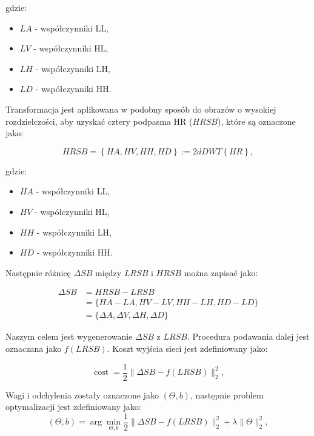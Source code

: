 gdzie:
\begin{itemize}
    \item $LA$ - współczynniki LL,
    \item $LV$ - współczynniki HL,
    \item $LH$ - współczynniki LH,
    \item $LD$ - współczynniki HH.
\end{itemize}


\newpage
Transformacja jest aplikowana w podobny sposób do obrazów o wysokiej rozdzielczości, aby uzyskać cztery podpasma HR ($HRSB$), które są oznaczone jako:

\begin{equation}
    H R S B = \left\{ HA, HV, HH, HD \right\} := 2dDWT\left\{HR\right\}, \label{eq:3.3}
\end{equation}

gdzie:
\begin{itemize}
    \item $HA$ - współczynniki LL,
    \item $HV$ - współczynniki HL,
    \item $HH$ - współczynniki LH,
    \item $HD$ - współczynniki HH.
\end{itemize}

Następnie różnicę $\Delta SB$ między $LRSB$ i $HRSB$ można zapisać jako:

\begin{equation}
    \begin{aligned}
    \Delta SB   & ={H R S B} - {L R S B} \\
                & =\{{HA}-{LA}, {HV}-{LV}, {HH}-{LH}, {HD}-{LD}\} \\
                & =\{\Delta {A}, \Delta {V}, \Delta {H}, \Delta {D}\}
    \end{aligned}
    \label{eq:3.4}
\end{equation}

Naszym celem jest wygenerowanie $\Delta SB$ z $LRSB$. Procedura podawania dalej jest oznaczana jako $f(LRSB)$. Koszt wyjścia sieci jest zdefiniowany jako:

\begin{equation}
    \operatorname{cost}=\frac{1}{2}\|\Delta SB-f(LRSB)\|_2^2,
\end{equation}


Wagi i odchylenia zostały oznaczone jako $(\Theta, b)$, następnie problem optymalizacji jest zdefiniowany jako:
\begin{equation}
    (\Theta, {b})=\arg \min _{\Theta, {b}} \frac{1}{2}\|\Delta SB-f(LRSB)\|_2^2+\lambda\|\Theta\|_2^2,
\end{equation}

